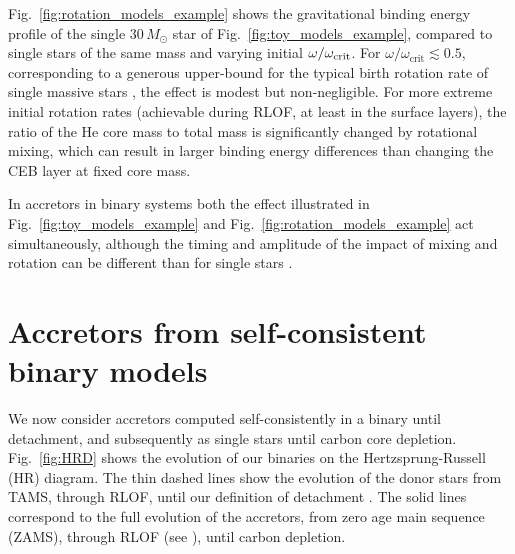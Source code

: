 \documentclass[twocolumn,twocolappendix,trackchanges]{aastex63}
\DeclareRobustCommand{\Figref}[1]{Fig.~\ref{#1}}
\begin{document}
\Figref{fig:rotation_models_example} shows the gravitational binding
energy profile of the single $30\,M_\odot$ star of
\Figref{fig:toy_models_example}, compared to single stars of the same
mass and varying initial $\omega/\omega_{\rm crit}$. %
For $\omega/\omega_\mathrm{crit}\lesssim 0.5$, corresponding to a
generous upper-bound for the typical birth rotation rate of single
massive stars \citep[e.g.,][]{ramirez-agudelo:2015}, the effect is
modest but non-negligible. For more extreme initial rotation rates
(achievable during RLOF, at least in the surface layers), the ratio of
the He core mass to total mass is significantly changed by rotational
mixing, which can result in larger binding energy differences than
changing the CEB layer at fixed core mass.


In accretors in binary systems both the
effect illustrated in \Figref{fig:toy_models_example} and
\Figref{fig:rotation_models_example} act simultaneously, although the
timing and amplitude of the impact of mixing and rotation can be
different than for single stars \citep{renzo:2021zoph}.

\section{Accretors from self-consistent binary models}
\label{sec:bin_models}

We now consider accretors computed self-consistently in a binary until
detachment, and subsequently as single stars until carbon core
depletion. \Figref{fig:HRD} shows the evolution of our binaries on the
Hertzsprung-Russell (HR) diagram. The thin dashed lines %
show the evolution of the donor stars from TAMS,
through RLOF, until our definition of detachment \citep[see, e.g.,][]{yoon:2017,
  gotberg:2017, gotberg:2018, laplace:2020, laplace:2021}. The solid
lines correspond to the full evolution of the accretors, from zero age
main sequence (ZAMS), through RLOF (see \citealt{sravan:2019,
  renzo:2021zoph, wang:2020}), until carbon depletion. %
\end{document}
